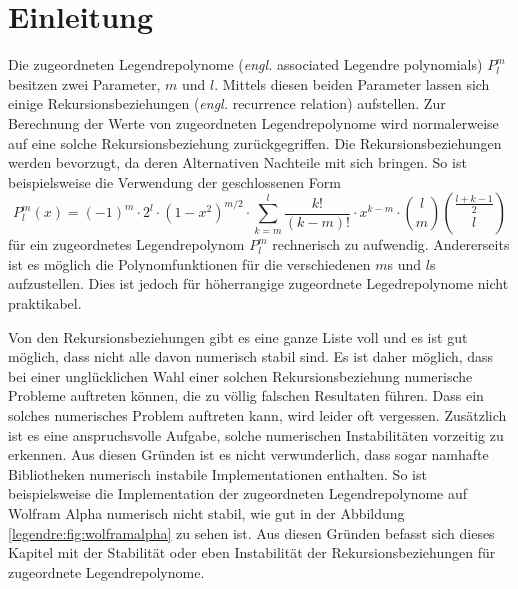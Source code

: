 %
%
%
\section{Einleitung\label{legendre:section:einleitung}}
Die zugeordneten Legendrepolynome (\textit{engl.} associated Legendre polynomials) $P^m_l$ besitzen zwei Parameter, $m$ und $l$.
Mittels diesen beiden Parameter lassen sich einige Rekursionsbeziehungen (\textit{engl.} recurrence relation) aufstellen.
Zur Berechnung der Werte von zugeordneten Legendrepolynome wird normalerweise auf eine solche Rekursionsbeziehung zurückgegriffen.
Die Rekursionsbeziehungen werden bevorzugt, da deren Alternativen Nachteile mit sich bringen.
So ist beispielsweise die Verwendung der geschlossenen Form
\begin{equation}
P^{m}_{l}(x)
=
(-1)^m \cdot 2^l \cdot (1-x^2)^{m/2}
\cdot \sum_{k=m}^{l} \frac{k!}{(k-m)!} \cdot x^{k-m}
\cdot \binom{l}{m} \binom{\frac{l+k-1}{2}}{l}
\label{legendre:geschlosseneform}
\end{equation}
für ein zugeordnetes Legendrepolynom $P^m_l$ rechnerisch zu aufwendig.
Andererseits ist es möglich die Polynomfunktionen für die verschiedenen $m$s und $l$s aufzustellen. Dies ist jedoch für höherrangige zugeordnete Legedrepolynome nicht praktikabel.

Von den Rekursionsbeziehungen gibt es eine ganze Liste voll und es ist gut möglich, dass nicht alle davon numerisch stabil sind.
Es ist daher möglich, dass bei einer unglücklichen Wahl einer solchen Rekursionsbeziehung numerische Probleme auftreten können, die zu völlig falschen Resultaten führen.
Dass ein solches numerisches Problem auftreten kann, wird leider oft vergessen.
Zusätzlich ist es eine anspruchsvolle Aufgabe, solche numerischen Instabilitäten vorzeitig zu erkennen.
Aus diesen Gründen ist es nicht verwunderlich, dass sogar namhafte Bibliotheken numerisch instabile Implementationen enthalten.
So ist beispielsweise die Implementation der zugeordneten Legendrepolynome auf Wolfram Alpha \cite{legendre:wolfram-alpha} numerisch nicht stabil, wie gut in der Abbildung \ref{legendre:fig:wolframalpha} zu sehen ist.
Aus diesen Gründen befasst sich dieses Kapitel mit der Stabilität oder eben Instabilität der Rekursionsbeziehungen für zugeordnete Legendrepolynome.

